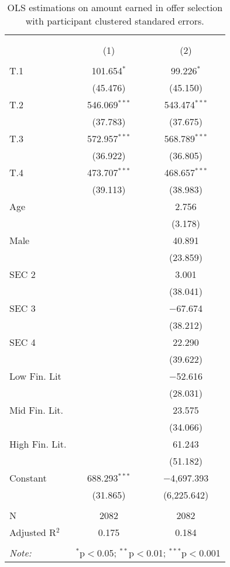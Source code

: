 
\begin{table}[H] \centering 
  \caption{OLS estimations on amount earned in offer selection with participant clustered standared errors.} 
  \label{tbl:treat_effects} 
\begin{tabular}{@{\extracolsep{5pt}}lcc} 
\\[-1.8ex]\hline 
\hline \\[-1.8ex] 
\\[-1.8ex] & (1) & (2)\\ 
\hline \\[-1.8ex] 
 T.1 & 101.654$^{*}$ & 99.226$^{*}$ \\ 
  & (45.476) & (45.150) \\ 
  T.2 & 546.069$^{***}$ & 543.474$^{***}$ \\ 
  & (37.783) & (37.675) \\ 
  T.3 & 572.957$^{***}$ & 568.789$^{***}$ \\ 
  & (36.922) & (36.805) \\ 
  T.4 & 473.707$^{***}$ & 468.657$^{***}$ \\ 
  & (39.113) & (38.983) \\ 
  Age &  & 2.756 \\ 
  &  & (3.178) \\ 
  Male &  & 40.891 \\ 
  &  & (23.859) \\ 
  SEC 2 &  & 3.001 \\ 
  &  & (38.041) \\ 
  SEC 3 &  & $-$67.674 \\ 
  &  & (38.212) \\ 
  SEC 4 &  & 22.290 \\ 
  &  & (39.622) \\ 
  Low Fin. Lit &  & $-$52.616 \\ 
  &  & (28.031) \\ 
  Mid Fin. Lit. &  & 23.575 \\ 
  &  & (34.066) \\ 
  High Fin. Lit. &  & 61.243 \\ 
  &  & (51.182) \\ 
  Constant & 688.293$^{***}$ & $-$4,697.393 \\ 
  & (31.865) & (6,225.642) \\ 
 \hline \\[-1.8ex] 
N & 2082 & 2082 \\ 
Adjusted R$^{2}$  & 0.175 & 0.184 \\ 
\hline 
\hline \\[-1.8ex] 
\textit{Note:}  & \multicolumn{2}{l}{$^{*}$p$<$0.05; $^{**}$p$<$0.01; $^{***}$p$<$0.001} \\ 
\end{tabular} 
\end{table} 
